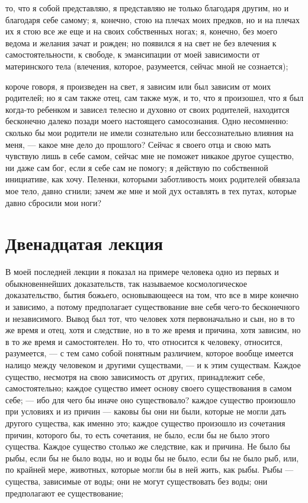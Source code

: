 \documentclass[12pt]{article}
\begin{document}
то, что я собой представляю, я представляю не только благодаря другим, но и благодаря себе самому; я, конечно, стою на плечах моих предков, но и на плечах их я стою все же еще и на своих собственных ногах; я, конечно, без моего ведома и желания зачат и рожден; но появился я на свет не без влечения к самостоятельности, к свободе, к эмансипации от моей зависимости от материнского тела (влечения, которое, разумеется, сейчас мной не сознается); 

короче говоря, я произведен на свет, я зависим или был зависим от моих родителей; но я сам также отец, сам также муж, и то, что я произошел, что я был когда-то ребенком и зависел телесно и духовно от своих родителей, находится бесконечно далеко позади моего настоящего самосознания. Одно несомненно: сколько бы мои родители не имели сознательно или бессознательно влияния на меня, --- какое мне дело до прошлого? Сейчас я своего отца и свою мать чувствую лишь в себе самом, сейчас мне не поможет никакое другое существо, ни даже сам бог, если я себе сам не помогу; я действую по собственной инициативе, как хочу. Пеленки, которыми заботливость моих родителей обвязала мое тело, давно сгнили; зачем же мне и мой дух оставлять в тех путах, которые давно сбросили мои ноги? 

\section*{Двенадцатая лекция}

В моей последней лекции я показал на примере человека одно из первых и обыкновеннейших доказательств, так называемое космологическое доказательство, бытия божьего, основывающееся на том, что все в мире конечно и зависимо, а потому предполагает существование вне себя чего-то бесконечного и независимого. Вывод был тот, что человек хотя первоначально и сын, но в то же время и отец, хотя и следствие, но в то же время и причина, хотя зависим, но в то же время и самостоятелен. Но то, что относится к человеку, относится, разумеется, --- с тем само собой понятным различием, которое вообще имеется налицо между человеком и другими существами, --- и к этим существам. Каждое существо, несмотря на свою зависимость от других, принадлежит себе, самостоятельно; каждое существо имеет основу своего существования в самом себе; --- ибо для чего бы иначе оно существовало? каждое существо произошло при условиях и из причин --- каковы бы они ни были, которые не могли дать другого существа, как именно это; каждое существо произошло из сочетания причин, которого бы, то есть сочетания, не было, если бы не было этого существа. Каждое существо столько же следствие, как и причина. Не было бы рыбы, если бы не было воды, но и воды бы не было, если бы не было рыб, или, по крайней мере, животных, которые могли бы в ней жить, как рыбы. Рыбы --- существа, зависимые от воды; они не могут существовать без воды; они предполагают ее существование; 
\end{document}
